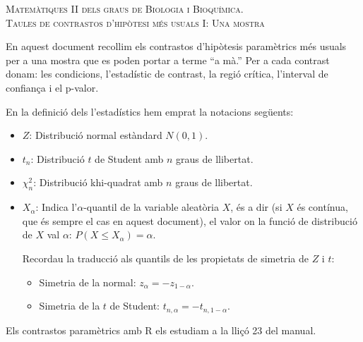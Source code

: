 \documentclass{article}
\renewcommand{\leq}{\leqslant}
\begin{document}

\renewcommand{\thecas}{\Roman{cas}}
\newcommand{\posacas}{\addtocounter{cas}{1}{\bf \thecas}}

\begin{center}
\textsc{Matemàtiques II dels graus de Biologia i Bioquímica.\\[0.5ex]  Taules de contrastos d'hipòtesi més usuals I: Una mostra}
\end{center}
\vspace*{2cm}

\noindent En aquest document recollim els contrastos d'hipòtesis paramètrics més usuals per a una mostra  que es poden portar a terme ``a mà.'' Per a cada contrast donam: les condicions, l'estadístic
de contrast, la regió crítica, 
l'interval de confian\c ca i el p-valor.

En la definició dels l'estadístics hem emprat la notacions següents:
\begin{itemize}
\item  $Z$: {Distribució normal estàndard $N(0,1)$.} 
\item $t_n$: {Distribució
$t$ de Student amb $n$ graus de llibertat.} 
\item $\chi_n^2$: {Distribució
khi-quadrat amb $n$ graus de llibertat.} 
\item $X_\alpha$: Indica l'$\alpha$-quantil de la variable aleatòria $X$, és a dir (si $X$ és contínua, que és sempre el cas en aquest document), el valor on la
funció de distribució de $X$ val $\alpha$: $P(X\leq X_\alpha
)=\alpha$. 

Recordau la traducció als quantils de les propietats de simetria de $Z$ i $t$:
\begin{itemize}
\item Simetria de la normal: $z_\alpha = -z_{1-\alpha}.$
\item Simetria de la $t$ de Student: $t_{n,\alpha} = -t_{n,1-\alpha}.$
\end{itemize}
\end{itemize}
Els contrastos paramètrics amb R els estudiam a la lliçó 23 del manual. 
\end{document}
